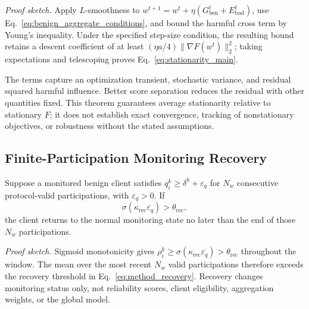 \noindent\textit{Proof sketch.} Apply $L$-smoothness to $w^{t+1}=w^t+\eta(G_{\mathrm{ben}}^t+E_{\mathrm{bad}}^t)$, use Eq.~\eqref{eq:benign_aggregate_conditions}, and bound the harmful cross term by Young's inequality. Under the specified step-size condition, the resulting bound retains a descent coefficient of at least $(\eta a/4)\|\nabla F(w^t)\|_2^2$; taking expectations and telescoping proves Eq.~\eqref{eq:stationarity_main}.

The terms capture an optimization transient, stochastic variance, and residual squared harmful influence. Better score separation reduces the residual with other quantities fixed. This theorem guarantees average stationarity relative to stationary $F$; it does not establish exact convergence, tracking of nonstationary objectives, or robustness without the stated assumptions.

\subsection{Finite-Participation Monitoring Recovery}

\begin{proposition}
\label{prop:finite_time_recovery}
Suppose a monitored benign client satisfies $q_i^k\geq\delta^k+\varepsilon_q$ for $N_w$ consecutive protocol-valid participations, with $\varepsilon_q>0$. If
\begin{equation}
\sigma(\kappa_{\mathrm{rec}}\varepsilon_q)>\theta_{\mathrm{rec}},
\label{eq:theory_recovery_condition}
\end{equation}
the client returns to the normal monitoring state no later than the end of those $N_w$ participations.
\end{proposition}

\noindent\textit{Proof sketch.} Sigmoid monotonicity gives $\rho_i^k\geq\sigma(\kappa_{\mathrm{rec}}\varepsilon_q)>\theta_{\mathrm{rec}}$ throughout the window. The mean over the most recent $N_w$ valid participations therefore exceeds the recovery threshold in Eq.~\eqref{eq:method_recovery}. Recovery changes monitoring status only, not reliability scores, client eligibility, aggregation weights, or the global model.
